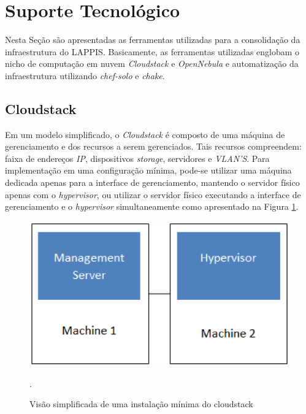 \section{Suporte Tecnológico}
Nesta Seção são apresentadas as ferramentas utilizadas para a consolidação da infraestrutura do LAPPIS. Basicamente, as ferramentas utilizadas englobam o nicho de computação em nuvem \textit{Cloudstack} e \textit{OpenNebula} e automatização da infraestrutura utilizando \textit{chef-solo} e \textit{chake}.
\subsection{Cloudstack}
\label{sub:subsecao}
Em um modelo simplificado, o \textit{Cloudstack} é composto de uma máquina de gerenciamento e dos recursos a serem gerenciados. Tais recursos compreendem: faixa de endereços \textit{IP}, dispositivos \textit{storage}, servidores e \textit{VLAN'S}. Para implementação em uma configuração mínima, pode-se utilizar uma máquina dedicada apenas para a interface de gerenciamento, mantendo o servidor físico apenas com o \textit{hypervisor}, ou utilizar o servidor físico executando a interface de gerenciamento e o \textit{hypervisor} simultaneamente como apresentado na Figura \ref{cloudstatck_minimal}. 

\begin{figure}[!htb]
\centering
\includegraphics [keepaspectratio=true,scale=0.60]{figuras/cloudstack_minimal.eps}
\caption{Visão simplificada de uma instalação mínima do cloudstack}
\cite{cloudstack}.
\label{cloudstatck_minimal}
\end{figure}


